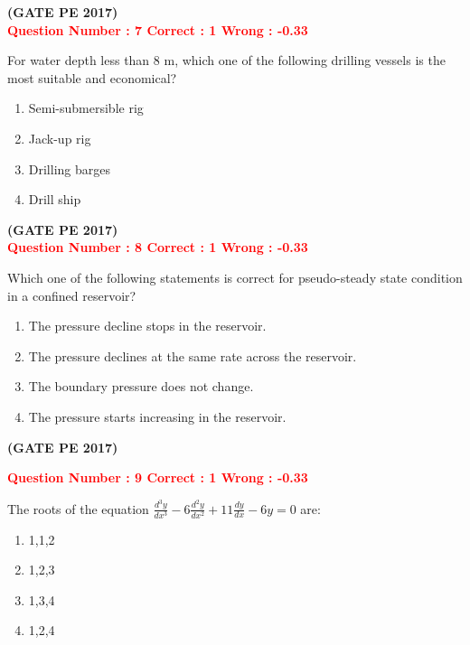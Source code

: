 \documentclass[12pt]{article}
\begin{document}
{\hfill\textbf{(GATE PE 2017)}\\[0.6cm]



\textcolor{red}{\textbf{Question Number : 7 \hfill Correct : 1  Wrong : -0.33}}

For water depth less than 8 m, which one of the following drilling vessels is the most suitable and economical?

\begin{enumerate}[label=(\Alph*)]
    \item Semi-submersible rig
    \item Jack-up rig
    \item Drilling barges
    \item Drill ship
\end{enumerate}
\hfill\textbf{(GATE PE 2017)}\\[0.6cm]

\textcolor{red}{\textbf{Question Number : 8 \hfill Correct : 1  Wrong : -0.33}}

Which one of the following statements is correct for pseudo-steady state condition in a confined reservoir?

\begin{enumerate}[label=(\Alph*)]
    \item The pressure decline stops in the reservoir.
    \item The pressure declines at the same rate across the reservoir.
    \item The boundary pressure does not change.
    \item The pressure starts increasing in the reservoir.
\end{enumerate}

\hfill\textbf{(GATE PE 2017)}\\[0.6cm]

\newpage

\textcolor{red}{\textbf{Question Number : 9 \hfill Correct : 1  Wrong : -0.33}}

The roots of the equation 
{\LARGE$ 
\frac{d^3 y}{dx^3} - 6 \frac{d^2 y}{dx^2} + 11 \frac{dy}{dx} - 6y = 0
$ }
are:

\begin{enumerate}[label=(\Alph*)]
    \item 1,1,2
    \item 1,2,3
    \item 1,3,4
    \item 1,2,4
\end{enumerate}

}
\end{document}
